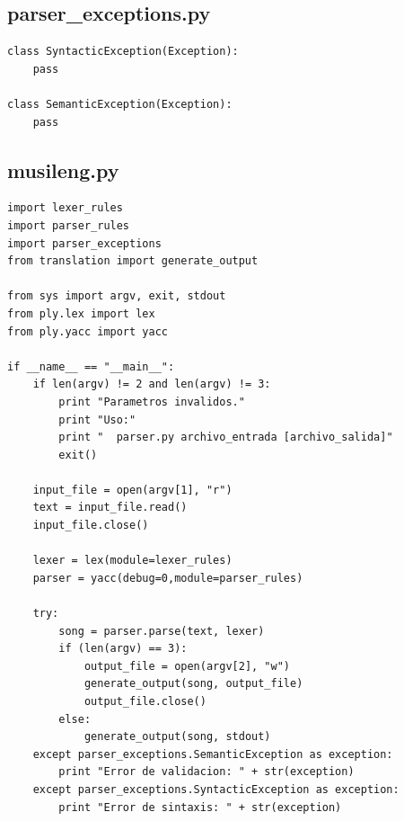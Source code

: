 \documentclass[a4paper, 10pt, twoside]{article}
\begin{document}
\subsection{parser\_exceptions.py}
\begin{verbatim}
class SyntacticException(Exception):    
    pass

class SemanticException(Exception):
    pass
\end{verbatim}
\subsection{musileng.py}
\begin{verbatim}
import lexer_rules
import parser_rules
import parser_exceptions
from translation import generate_output

from sys import argv, exit, stdout
from ply.lex import lex
from ply.yacc import yacc

if __name__ == "__main__":
    if len(argv) != 2 and len(argv) != 3:
        print "Parametros invalidos."
        print "Uso:"
        print "  parser.py archivo_entrada [archivo_salida]"
        exit()

    input_file = open(argv[1], "r")
    text = input_file.read()
    input_file.close()

    lexer = lex(module=lexer_rules)
    parser = yacc(debug=0,module=parser_rules)
        
    try:
        song = parser.parse(text, lexer)
        if (len(argv) == 3):
            output_file = open(argv[2], "w")
            generate_output(song, output_file)
            output_file.close()
        else:
            generate_output(song, stdout)
    except parser_exceptions.SemanticException as exception:
        print "Error de validacion: " + str(exception)
    except parser_exceptions.SyntacticException as exception:
        print "Error de sintaxis: " + str(exception)
\end{verbatim}
\end{document}
